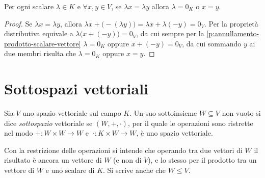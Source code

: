 \begin{proprieta} \label{p:cancellazione-scalare}
	Per ogni scalare $\lambda\in K$ e $\forall  x,  y\in V$, se $\lambda  x=\lambda  y$ allora $\lambda=0_K$ o $  x=  y$.
\end{proprieta}
\begin{proof}
	Se $\lambda  x=\lambda  y$, allora $\lambda  x+\big(-(\lambda  y)\big)=\lambda  x+\lambda(-  y)=0_V$.
	Per la proprietà distributiva equivale a $\lambda\big(  x+(-  y)\big)=0_V$, da cui sempre per la \ref{p:annullamento-prodotto-scalare-vettore} $\lambda=0_K$ oppure $  x+(-  y)=0_V$, da cui sommando $  y$ ai due membri risulta che $\lambda=0_K$ oppure $  x=  y$.
\end{proof}

\section{Sottospazi vettoriali} \label{ref:sottospazi-vettoriali}
\begin{definizione} \label{d:sottospazio-vettoriale}
	Sia $V$ uno spazio vettoriale sul campo $K$.
	Un suo sottoinsieme $W\subseteq V$ non vuoto si dice \emph{sottospazio} vettoriale se $(W,+,\cdot)$, per il quale le operazioni sono ristrette nel modo $+\colon W\times W\to W$ e $\ \cdot\colon K\times W\to W$, è uno spazio vettoriale.
\end{definizione}
Con la restrizione delle operazioni si intende che operando tra due vettori di $W$ il risultato è ancora un vettore di $W$ (e non di $V$), e lo stesso per il prodotto tra un vettore di $W$ e uno scalare di $K$. Si scrive anche che $W\leq V$.
